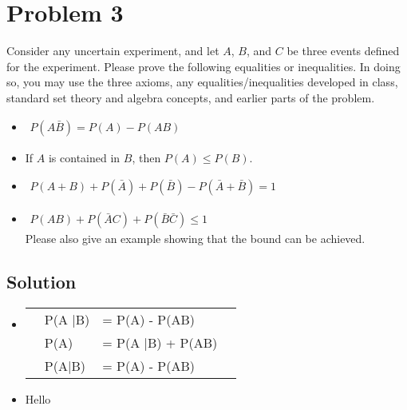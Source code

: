 \section{Problem 3}
Consider any uncertain experiment, and let $A$, $B$, and $C$ be three events defined for the experiment. Please prove the following equalities or inequalities. In doing so, you may use the three axioms, any equalities/inequalities developed in class, standard set theory and algebra concepts, and earlier parts of the problem.

\begin{itemize}
	\item
	\!  %
	$
	\begin{aligned}
		P(A\bar B) = P(A) -  P(AB) \nonumber
	\end{aligned}
	$
	\item 
	\! If $A$ is contained in $B$, then $P(A) \leq P(B)$.
	\item  
	\! 
	$
		\begin{aligned}
			P(A+B) + P(\bar A) + P(\bar B) - P(\bar A + \bar B) = 1 \nonumber
		\end{aligned}
	$ 
	\item
	\!  
	$
		\begin{aligned}
			P(AB) + P(\bar A C) + P(\bar B \bar C) \leq 1 \nonumber
		\end{aligned}
	$ \\[5pt]
	Please also give an example showing that the bound can be achieved.
\end{itemize}

\subsection{Solution}

\begin{itemize}
	\item 
		\!
			\begin{tabular}{L L L L}
				 & P(A \bar{B}) &= P(A) - P(AB) &  \\
				 & P(A) &= P(A \bar{B}) + P(AB) &  \\
				 & P(A\bar{B}) &= P(A) - P(AB) & 
			\end{tabular}
		\item Hello
\end{itemize}